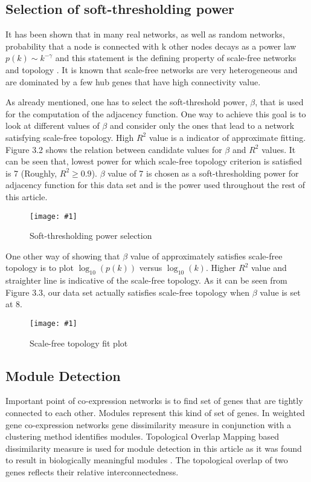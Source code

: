 \documentclass{ba-kecs}
\numberwithin{figure}{section}
\numberwithin{equation}{section}
\newcommand{\dkepic}[2]{ %
	\begin{figure}[H] %
	\texttt{[image: \#1]}
	\caption{#2}
	\label{#1}
	\end{figure}
}
\begin{document}
\subsection{Selection of soft-thresholding power}

It has been shown that in many real networks, as well as random networks, probability that a node is connected with k other nodes decays as a power law $p(k) \sim k ^{-\gamma}$ and this statement is the defining property of scale-free networks and topology \cite{barabas1999}. It is known that scale-free networks are very heterogeneous and are dominated by a few hub genes that have high connectivity value.

As already mentioned, one has to select the soft-threshold power, $\beta$, that is used for the computation of the adjacency function. One way to achieve this goal is to look at different values of $\beta$ and consider only the ones that lead to a network satisfying scale-free topology. High $R^2$ value is a indicator of approximate fitting. Figure 3.2 shows the relation between candidate values for $\beta$ and $R^2$ values. It can be seen that, lowest power for which scale-free topology criterion is satisfied is 7 (Roughly, $R^2 \geq 0.9$). $\beta$ value of 7 is chosen as a soft-thresholding power for adjacency function for this data set and is the power used throughout the rest of this article.

\dkepic{powerNew}{Soft-thresholding power selection}


One other way of showing that $\beta$ value of approximately satisfies scale-free topology is to plot $\log_10(p(k))$ versus $\log_10(k)$. Higher $R^2$ value and straighter line is indicative of the scale-free topology. As it can be seen from Figure 3.3, our data set actually satisfies scale-free topology when $\beta$ value is set at 8.


\dkepic{scaleFreeNew}{Scale-free topology fit plot}

\subsection{Module Detection}
Important point of co-expression networks is to find set of genes that are tightly connected to each other. Modules represent this kind of set of genes. In weighted gene co-expression networks gene dissimilarity measure in conjunction with a clustering method identifies modules. Topological Overlap Mapping based dissimilarity measure is used for module detection in this article as it was found to result in biologically meaningful modules \cite{ravasz2002}. The topological overlap of two genes reflects their relative interconnectedness.
\end{document}
